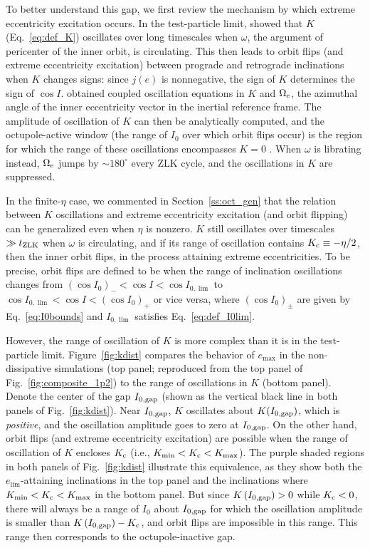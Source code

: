 \documentclass[
        fleqn,
        usenatbib,
    ]{mnras}
\newcommand*{\p}[1]{\left(#1\right)}
\begin{document}
To better understand this gap, we first review the mechanism by which extreme
eccentricity excitation occurs. In the test-particle limit, \citet{katz2011long}
showed that $K$ (Eq.~\ref{eq:def_K}) oscillates over long timescales when
$\omega$, the argument of pericenter of the inner orbit, is circulating. This
then leads to orbit flips (and extreme eccentricity excitation) between prograde
and retrograde inclinations when $K$ changes signs: since $j(e)$ is nonnegative,
the sign of $K$ determines the sign of $\cos I$. \citet{katz2011long} obtained
coupled oscillation equations in $K$ and $\Omega_{\rm e}$, the azimuthal angle
of the inner eccentricity vector in the inertial reference frame. The amplitude
of oscillation of $K$ can then be analytically computed, and the octupole-active
window (the range of $I_0$ over which orbit flips occur) is the region for which
the range of these oscillations encompasses $K = 0$ \citep{katz2011long}.
When $\omega$ is librating instead, $\Omega_{\rm e}$ jumps by $\sim 180^\circ$
every ZLK cycle, and the oscillations in $K$ are suppressed.

In the finite-$\eta$ case, we commented in Section~\ref{ss:oct_gen} that the
relation between $K$ oscillations and extreme eccentricity excitation (and
orbit flipping) can be generalized even when $\eta$ is nonzero. $K$ still
oscillates over timescales $\gg t_{\rm ZLK}$ when $\omega$ is circulating, and
if its range of oscillation contains $K_{\rm c} \equiv -\eta / 2$, then the
inner orbit flips, in the process attaining extreme eccentricities. To be
precise, orbit flips are defined to be when the range of inclination
oscillations changes from $\p{\cos I_0}_- < \cos I < \cos I_{0, \lim}$ to $\cos
I_{0, \lim} < \cos I < \p{\cos I_0}_+$ or vice versa, where $\p{\cos I_0}_{\pm}$
are given by Eq.~\eqref{eq:I0bounds} and $I_{0, \lim}$ satisfies
Eq.~\eqref{eq:def_I0lim}.

However, the range of oscillation of $K$ is more complex than it is in the
test-particle limit. Figure~\ref{fig:kdist} compares the behavior of $e_{\max}$
in the non-dissipative simulations (top panel; reproduced from the top panel of
Fig.~\ref{fig:composite_1p2}) to the range of oscillations in $K$ (bottom
panel). Denote the center of the gap $I_{\rm 0, gap}$ (shown as the vertical
black line in both panels of Fig.~\ref{fig:kdist}). Near $I_{\rm 0, gap}$, $K$
oscillates about $K(I_{\rm 0, gap})$, which is \emph{positive}, and the
oscillation amplitude goes to zero at $I_{\rm 0, gap}$. On the other hand, orbit
flips (and extreme eccentricity excitation) are possible when the range of
oscillation of $K$ encloses $K_{\rm c}$ (i.e., $K_{\min} < K_{\rm c} <
K_{\max}$). The purple shaded regions in both panels of Fig.~\ref{fig:kdist}
illustrate this equivalence, as they show both the $e_{\lim}$-attaining
inclinations in the top panel and the inclinations where $K_{\min} < K_{\rm c} <
K_{\max}$ in the bottom panel. But since $K\p{I_{\rm 0, gap}} > 0$ while $K_{\rm
c} < 0$, there will always be a range of $I_0$ about $I_{\rm 0, gap}$ for which
the oscillation amplitude is smaller than $K\p{I_{\rm 0, gap}} - K_{\rm c}$, and
orbit flips are impossible in this range. This range then corresponds to the
octupole-inactive gap.
\end{document}

